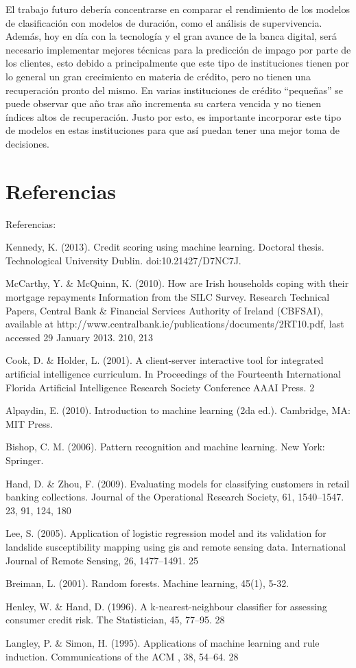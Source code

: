 \documentclass[a4paper,12pt]{article}
\begin{document}
El trabajo futuro debería concentrarse en comparar el rendimiento de los modelos de clasificación con modelos de duración, como el análisis de supervivencia. Además, hoy en día con la tecnología y el gran avance de la banca digital, será necesario implementar mejores técnicas para la predicción de impago por parte de los clientes, esto debido a principalmente que este tipo de instituciones tienen por lo general un gran crecimiento en materia de crédito, pero no tienen una recuperación pronto del mismo. En varias instituciones de crédito ``pequeñas'' se puede observar que año tras año incrementa su cartera vencida y no tienen índices altos de recuperación. Justo por esto, es importante incorporar este tipo de modelos en estas instituciones para que así puedan tener una mejor toma de decisiones.

\section{Referencias}

Referencias:

Kennedy, K. (2013). Credit scoring using machine learning. Doctoral thesis. Technological University Dublin. doi:10.21427/D7NC7J. 

McCarthy, Y. \& McQuinn, K. (2010). How are Irish households coping with their mortgage repayments Information from the SILC Survey. Research Technical Papers, Central Bank \& Financial Services Authority of Ireland (CBFSAI),\\available at http://www.centralbank.ie/publications/documents/2RT10.pdf, last accessed 29 January 2013. 210, 213

Cook, D. \& Holder, L. (2001). A client-server interactive tool for integrated artificial intelligence curriculum. In Proceedings of the Fourteenth International Florida Artificial Intelligence Research Society Conference AAAI Press. 2

Alpaydin, E. (2010). Introduction to machine learning (2da ed.). Cambridge, MA: MIT Press.

Bishop, C. M. (2006). Pattern recognition and machine learning. New York: Springer.

Hand, D. \& Zhou, F. (2009). Evaluating models for classifying customers in retail banking collections. Journal of the Operational Research Society, 61, 1540–1547. 23, 91, 124, 180

Lee, S. (2005). Application of logistic regression model and its validation for landslide susceptibility mapping using gis and remote sensing data. International Journal of Remote Sensing, 26, 1477–1491. 25

Breiman, L. (2001). Random forests. Machine learning, 45(1), 5-32.

Henley, W. \& Hand, D. (1996). A k-nearest-neighbour classifier for assessing consumer credit risk. The Statistician, 45, 77–95. 28

Langley, P. \& Simon, H. (1995). Applications of machine learning and rule induction. Communications of the ACM , 38, 54–64. 28
\end{document}
